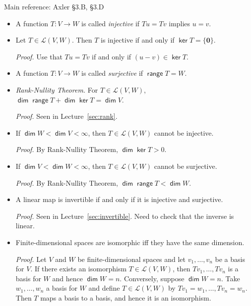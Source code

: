 \documentclass[11pt]{article}
\newcommand{\1}{\mathbf{1}}
\newcommand{\0}{\mathbf{0}}
\newcommand{\C}{\mathbb{C}}
\newcommand{\F}{\mathbb{F}}
\newcommand{\cL}{\mathcal{L}}
\newcommand{\R}{\mathbb{R}}
\DeclareMathOperator{\myrange}{\mathsf{range}}
\DeclareMathOperator{\myker}{\mathsf{ker}}
\DeclareMathOperator{\mydim}{\mathsf{dim}}
\newcommand{\spitem}{\item[$\circ$]}
\begin{document}
Main reference:
Axler \S3.B, \S3.D


\begin{itemize}

\item

A function $T : V \to W $ is called \emph{injective} if $T u = T v$ implies $u = v$.

\item

Let $ T \in \cL(V, W)$. Then $T$ is injective if and only if $ \myker T = \{\0\} $.

\emph{Proof.}
Use that $Tu = Tv$ if and only if $(u-v) \in \myker T$.

\item

A function $T : V \to W $ is called \emph{surjective} if $\myrange T = W$.

\item

\emph{Rank-Nullity Theorem.}
For $T\in\cL(V,W)$, $\mydim\myrange T + \mydim \myker T = \mydim V$.

\emph{Proof.}
Seen in Lecture~\ref{sec:rank}.

\item

If $\mydim W < \mydim V < \infty$, then $T\in\cL(V,W)$ cannot be injective.

\emph{Proof.}
By Rank-Nullity Theorem, $\mydim \myker T > 0$.

\item

If $\mydim V < \mydim W < \infty$, then $T\in\cL(V,W)$ cannot be surjective.

\emph{Proof.}
By Rank-Nullity Theorem, $\mydim \myrange T < \mydim W$.

\item

A linear map is invertible if and only if it is injective and surjective.

\emph{Proof.}
Seen in Lecture~\ref{sec:invertible}.
Need to check that the inverse is linear.

\spitem

Finite-dimensional spaces are isomorphic iff they have the same dimension.

\emph{Proof.}
Let $V$ and $W$ be finite-dimensional spaces and let $v_1,\dots,v_n$ be a basis for $V$.
If there exists an isomorphism $T \in \cL(V,W)$, then $Tv_1,\dots,Tv_n$ is a basis for $W$ and hence $\mydim W = n$.
Conversely, suppose $\mydim W = n$. Take $w_1,\dots,w_n$ a basis for $W$ and define $T \in \cL(V,W)$ by $Tv_1=w_1,\dots,Tv_n=w_n$. Then $T$ maps a basis to a basis, and hence it is an isomorphism.


\end{itemize}
\end{document}
